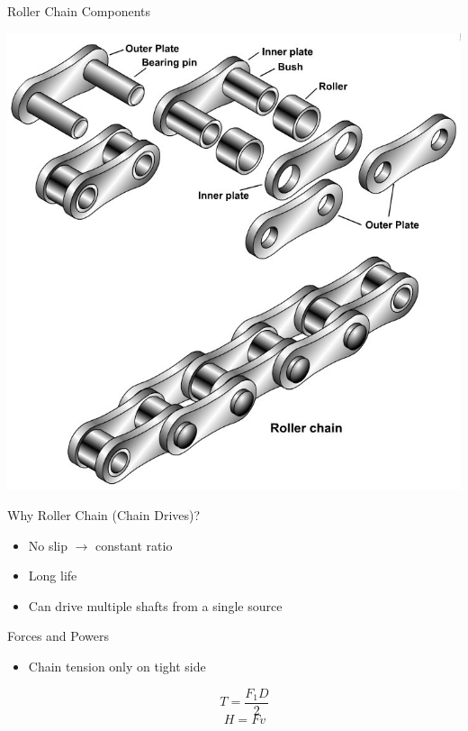 \documentclass[10pt, svgnames]{beamer}
\begin{document}
\begin{frame}[label={sec:org0c6e00a}]{Roller Chain Components}
\begin{center}
\includegraphics[height=0.9\textheight]{./pictures/roller-chain-parts.jpg}
\end{center}
\end{frame}

\begin{frame}[label={sec:org7ae407c}]{Why Roller Chain (Chain Drives)?}
\begin{itemize}
\item No slip \(\rightarrow\) constant ratio
\item Long life
\item Can drive multiple shafts from a single source
\end{itemize}
\end{frame}

\begin{frame}[label={sec:org29f57c5}]{Forces and Powers}
\begin{itemize}
\item Chain tension only on tight side

$$ T = \frac{F_{1}D}{2} $$
$$ H = Fv $$
\end{itemize}
\end{frame}
\end{document}
